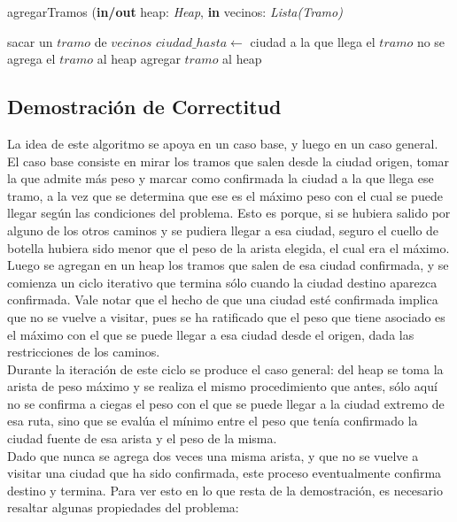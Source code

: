 \begin{algorithm}
\caption{agregarTramos (\textbf{in/out} heap: \textsl{Heap}, \textbf{in} vecinos: \textsl{Lista(Tramo)}}
\begin{algorithmic}[1]

	\STATE sacar un $tramo$ de $vecinos$
	\STATE $ciudad\_hasta \leftarrow$ ciudad a la que llega el $tramo$
		\STATE no se agrega el $tramo$ al heap
	\ELSE 
		\STATE agregar $tramo$ al heap
	\ENDIF
\ENDWHILE
\end{algorithmic}
\end{algorithm}

\clearpage

\subsection{Demostración de Correctitud}

La idea de este algoritmo se apoya en un caso base, y luego en un caso general. El caso base consiste en mirar los tramos que salen desde la ciudad origen, tomar la que admite más peso y marcar como confirmada la ciudad a la que llega ese tramo, a la vez que se determina que ese es el máximo peso con el cual se puede llegar según las condiciones del problema. Esto es porque, si se hubiera salido por alguno de los otros caminos y se pudiera llegar a esa ciudad, seguro el cuello de botella hubiera sido menor que el peso de la arista elegida, el cual era el máximo. Luego se agregan en un heap los tramos que salen de esa ciudad confirmada, y se comienza un ciclo iterativo que termina sólo cuando la ciudad destino aparezca confirmada. Vale notar que el hecho de que una ciudad esté confirmada implica que no se vuelve a visitar, pues se ha ratificado que el peso que tiene asociado es el máximo con el que se puede llegar a esa ciudad desde el origen, dada las restricciones de los caminos.\\
\indent Durante la iteración de este ciclo se produce el caso general: del heap se toma la arista de peso máximo y se realiza el mismo procedimiento que antes, sólo aquí no se confirma a ciegas el peso con el que se puede llegar a la ciudad extremo de esa ruta, sino que se evalúa el mínimo entre el peso que tenía confirmado la ciudad fuente de esa arista y el peso de la misma.\\
\indent Dado que nunca se agrega dos veces una misma arista, y que no se vuelve a visitar una ciudad que ha sido confirmada, este proceso eventualmente confirma destino y termina. Para ver esto en lo que resta de la demostración, es necesario resaltar algunas propiedades del problema:

